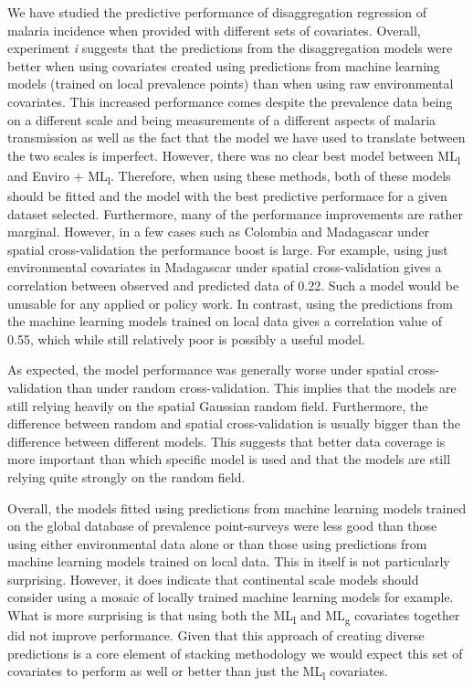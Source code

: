 \documentclass[review]{elsarticle}
\begin{document}
We have studied the predictive performance of disaggregation regression of malaria incidence when provided with different sets of covariates.
Overall, experiment \emph{i} suggests that the predictions from the disaggregation models were better when using covariates created using predictions from machine learning models (trained on local prevalence points) than when using raw environmental covariates.
This increased performance comes despite the prevalence data being on a different scale and being measurements of a different aspects of malaria transmission as well as the fact that the model we have used to translate between the two scales is imperfect.
However, there was no clear best model between ML\textsubscript{l} and Enviro + ML\textsubscript{l}.
Therefore, when using these methods, both of these models should be fitted and the model with the best predictive performace for a given dataset selected.
Furthermore, many of the performance improvements are rather marginal. 
However, in a few cases such as Colombia and Madagascar under spatial cross-validation the performance boost is large.
For example, using just environmental covariates in Madagascar under spatial cross-validation gives a correlation between observed and predicted data of 0.22.
Such a model would be unusable for any applied or policy work.
In contrast, using the predictions from the machine learning models trained on local data gives a correlation value of 0.55, which while still relatively poor is possibly a useful model.

As expected, the model performance was generally worse under spatial cross-validation than under random cross-validation.
This implies that the models are still relying heavily on the spatial Gaussian random field.
Furthermore, the difference between random and spatial cross-validation is usually bigger than the difference between different models.
This suggests that better data coverage is more important than which specific model is used and that the models are still relying quite strongly on the random field.






Overall, the models fitted using predictions from machine learning models trained on the global database of prevalence point-surveys were less good than those using either environmental data alone or than those using predictions from machine learning models trained on local data.
This in itself is not particularly surprising.
However, it does indicate that continental scale models should consider using a mosaic of locally trained machine learning models for example.
What is more surprising is that using both the ML\textsubscript{l} and ML\textsubscript{g} covariates together did not improve performance.
Given that this approach of creating diverse predictions is a core element of stacking methodology we would expect this set of covariates to perform as well or better than just the ML\textsubscript{l} covariates.
\end{document}
